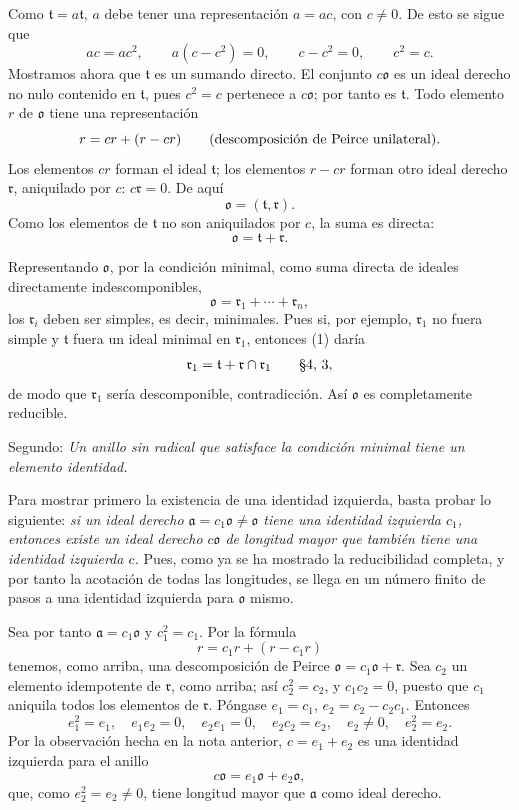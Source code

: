 \documentclass[11pt]{article}
\providecommand{\mo}{\mathfrak{o}}
\providecommand{\ma}{\mathfrak{a}}
\providecommand{\mr}{\mathfrak{r}}
\providecommand{\mt}{\mathfrak{t}}
\begin{document}
Como $\mt=a\mt$, $a$ debe tener una representación $a=ac$, con $c\ne0$. De esto se sigue que
\[
        ac=ac^2,
        \qquad a(c-c^2)=0,
        \qquad c-c^2=0,
        \qquad c^2=c.
\]
Mostramos ahora que $\mt$ es un sumando directo. El conjunto $c\mo$ es un ideal derecho no nulo contenido en $\mt$, pues $c^2=c$ pertenece a $c\mo$; por tanto es $\mt$. Todo elemento $r$ de $\mo$ tiene una representación
\[
        r=cr+(r-cr) \qquad \hbox{(descomposición de Peirce unilateral).}
\]
Los elementos $cr$ forman el ideal $\mt$; los elementos $r-cr$ forman otro ideal derecho $\mr$, aniquilado por $c$: $c\mr=0$. De aquí
\[
        \mo=(\mt,\mr).
\]
Como los elementos de $\mt$ no son aniquilados por $c$, la suma es directa:
\begin{equation}
        \mo=\mt+\mr.                                             \tag{1}
\end{equation}

Representando $\mo$, por la condición minimal, como suma directa de ideales directamente indescomponibles,
\[
        \mo=\mr_1+\cdots+\mr_n,
\]
los $\mr_i$ deben ser simples, es decir, minimales. Pues si, por ejemplo, $\mr_1$ no fuera simple y $\mt$ fuera un ideal minimal en $\mr_1$, entonces (1) daría
\[
        \mr_1=\mt+\mr\cap\mr_1 \qquad \hbox{§4, 3},
\]
de modo que $\mr_1$ sería descomponible, contradicción. Así $\mo$ es completamente reducible.

Segundo: \emph{Un anillo sin radical que satisface la condición minimal tiene un elemento identidad.}

Para mostrar primero la existencia de una identidad izquierda, basta probar lo siguiente: \emph{si un ideal derecho $\ma=c_1\mo\ne\mo$ tiene una identidad izquierda $c_1$, entonces existe un ideal derecho $c\mo$ de longitud mayor que también tiene una identidad izquierda $c$.} Pues, como ya se ha mostrado la reducibilidad completa, y por tanto la acotación de todas las longitudes, se llega en un número finito de pasos a una identidad izquierda para $\mo$ mismo.

Sea por tanto $\ma=c_1\mo$ y $c_1^2=c_1$. Por la fórmula
\[
        r=c_1r+(r-c_1r)
\]
tenemos, como arriba, una descomposición de Peirce $\mo=c_1\mo+\mr$. Sea $c_2$ un elemento idempotente de $\mr$, como arriba; así $c_2^2=c_2$, y $c_1c_2=0$, puesto que $c_1$ aniquila todos los elementos de $\mr$. Póngase $e_1=c_1$, $e_2=c_2-c_2c_1$. Entonces
\[
        e_1^2=e_1,
        \quad e_1e_2=0,
        \quad e_2e_1=0,
        \quad e_2c_2=e_2,
        \quad e_2\ne0,
        \quad e_2^2=e_2.
\]
Por la observación hecha en la nota anterior, $c=e_1+e_2$ es una identidad izquierda para el anillo
\[
        c\mo=e_1\mo+e_2\mo,
\]
que, como $e_2^2=e_2\ne0$, tiene longitud mayor que $\ma$ como ideal derecho.
\end{document}

